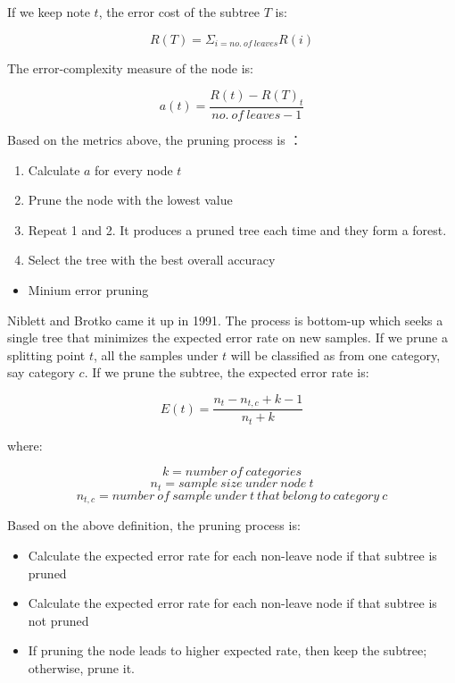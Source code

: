 \documentclass[12pt,]{krantz}
\providecommand{\tightlist}{%
  \setlength{\itemsep}{0pt}\setlength{\parskip}{0pt}}
\begin{document}
If we keep note \(t\), the error cost of the subtree \(T\) is:

\[R(T)=\Sigma_{i = no.\ of\ leaves} R(i)\]

The error-complexity measure of the node is:

\[a(t)=\frac{R(t)-R(T)_{t}}{no.\ of\ leaves - 1}\]

Based on the metrics above, the pruning process is \citep{Nikita2012}：

\begin{enumerate}
\def\labelenumi{\arabic{enumi}.}
\tightlist
\item
  Calculate \(a\) for every node \(t\)
\item
  Prune the node with the lowest value
\item
  Repeat 1 and 2. It produces a pruned tree each time and they form a forest.
\item
  Select the tree with the best overall accuracy
\end{enumerate}

\begin{itemize}
\tightlist
\item
  Minium error pruning
\end{itemize}

Niblett and Brotko came it up in 1991\citep{Cestnik1991}. The process is bottom-up which seeks a single tree that minimizes the expected error rate on new samples. If we prune a splitting point \(t\), all the samples under \(t\) will be classified as from one category, say category \(c\). If we prune the subtree, the expected error rate is:

\[E(t)=\frac{n_{t}-n_{t,c}+k-1}{n_{t}+k}\]

where:

\[k=number\ of\ categories\]
\[n_{t}=sample\ size\ under\ node\ t\]
\[n_{t,c}= number\ of\ sample\ under\ t\ that\ belong\ to\ category\ c\]

Based on the above definition, the pruning process is\citep{Espoito1997}:

\begin{itemize}
\tightlist
\item
  Calculate the expected error rate for each non-leave node if that subtree is pruned
\item
  Calculate the expected error rate for each non-leave node if that subtree is not pruned
\item
  If pruning the node leads to higher expected rate, then keep the subtree; otherwise, prune it.
\end{itemize}
\end{document}

